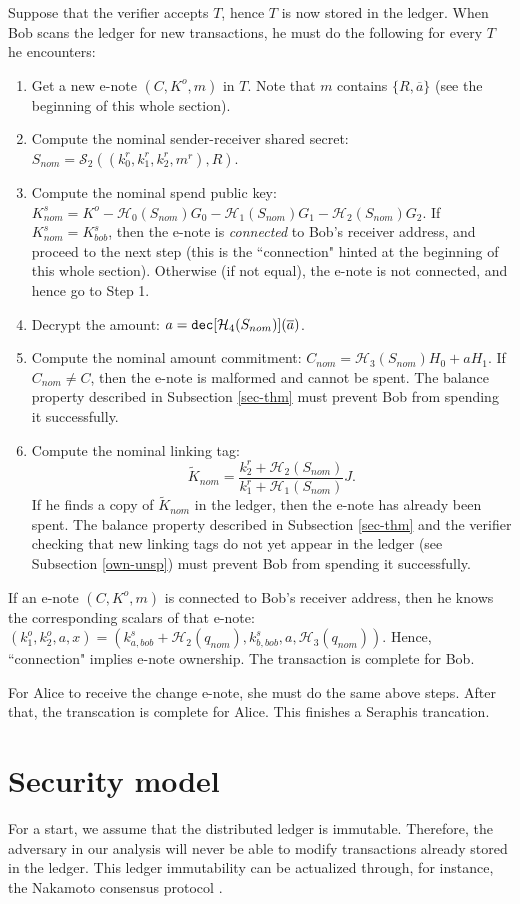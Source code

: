 \documentclass{article}
\theoremstyle{plain}
\theoremstyle{remark}
\begin{document}
Suppose that the verifier accepts $T$, hence $T$ is now stored in the ledger. When Bob scans the ledger for new transactions, he must do the following for every $T$ he encounters:
\begin{enumerate}
    \item Get a new e-note $(C, K^o, m)$ in $T$. Note that $m$ contains $\{R, \overline{a}\}$ (see the beginning of this whole section).
    \item Compute the nominal sender-receiver shared secret: $S_{nom} = \mathcal{S}_2((k_0^r, k_1^r, k_2^r, m^r), R) $.
    \item Compute the nominal spend public key: $K_{nom}^s = K^o - \mathcal{H}_0(S_{nom}) G_0 - \mathcal{H}_1(S_{nom}) G_1 - \mathcal{H}_2(S_{nom}) G_2$. If $K_{nom}^s = K_{bob}^s$, then the e-note is \textit{connected} to Bob's receiver address, and proceed to the next step (this is the ``connection" hinted at the beginning of this whole section).  Otherwise (if not equal), the e-note is not connected, and hence go to Step 1.
    \item Decrypt the amount: $a = {\tt dec}[\mathcal{H}_4(S_{nom})](\overline a)$.
    \item Compute the nominal amount commitment: $C_{nom} = \mathcal{H}_3(S_{nom}) H_0 + a H_1$. If $C_{nom} \ne C$, then the e-note is malformed and cannot be spent. The balance property described in Subsection \ref{sec-thm} must prevent Bob from spending it successfully.
    \item Compute the nominal linking tag: $$\tilde{K}_{nom} = \frac{k_2^r + \mathcal{H}_2(S_{nom})}{k_1^r + \mathcal{H}_1(S_{nom})}J.$$ If he finds a copy of $\tilde{K}_{nom}$ in the ledger, then the e-note has already been spent. The balance property described in Subsection \ref{sec-thm} and the verifier checking that new linking tags do not yet appear in the ledger (see Subsection \ref{own-unsp}) must prevent Bob from spending it successfully.
\end{enumerate}
If an e-note $(C, K^o, m)$ is connected to Bob's receiver address, then he knows the corresponding scalars of that e-note: $(k_1^o, k_2^o, a, x) = (k_{a, bob}^s + \mathcal{H}_2(q_{nom}), k_{b, bob}^s, a, \mathcal{H}_3(q_{nom}))$. Hence, ``connection" implies e-note ownership. The transaction is complete for Bob.

For Alice to receive the change e-note, she must do the same above steps. After that, the transcation is complete for Alice. This finishes a Seraphis trancation.

\section{Security model}\label{sec}
For a start, we assume that the distributed ledger is immutable. Therefore, the adversary in our analysis will never be able to modify transactions already stored in the ledger. This ledger immutability can be actualized through, for instance, the Nakamoto consensus protocol \cite{bitcoin}.
\end{document}
